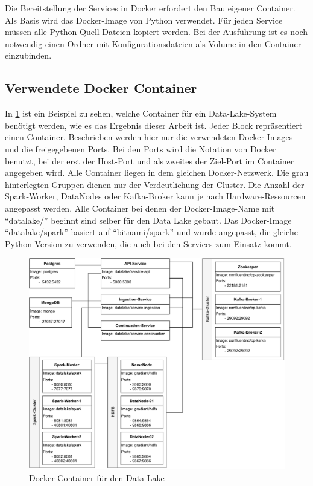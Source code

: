 Die Bereitstellung der Services in Docker erfordert den Bau eigener Container.
Als Basis wird das Docker-Image von Python verwendet.
Für jeden Service müssen alle Python-Quell-Dateien kopiert werden.
Bei der Ausführung ist es noch notwendig einen Ordner mit Konfigurationsdateien als Volume in den Container einzubinden.

\subsection{Verwendete Docker Container}

In \cref{fig:docker-datalake} ist ein Beispiel zu sehen, welche Container für ein Data-Lake-System benötigt werden, wie es das Ergebnis dieser Arbeit ist.
Jeder Block repräsentiert einen Container.
Beschrieben werden hier nur die verwendeten Docker-Images und die freigegebenen Ports.
Bei den Ports wird die Notation von Docker benutzt, bei der erst der Host-Port und als zweites der Ziel-Port im Container angegeben wird.
Alle Container liegen in dem gleichen Docker-Netzwerk.
Die grau hinterlegten Gruppen dienen nur der Verdeutlichung der Cluster.
Die Anzahl der Spark-Worker, DataNodes oder Kafka-Broker kann je nach Hardware-Ressourcen angepasst werden.
Alle Container bei denen der Docker-Image-Name mit "`datalake/"' beginnt sind selber für den Data Lake gebaut.
Das Docker-Image "`datalake/spark"' basiert auf "`bitnami/spark"' und wurde angepasst, die gleiche Python-Version zu verwenden, die auch bei den Services zum Einsatz kommt.

\begin{figure}
    \centering
    \includegraphics[width=\textwidth]{Grafiken/Umsetzung-Docker-Lake.pdf}
    \caption{Docker-Container für den Data Lake}
    \label{fig:docker-datalake}
\end{figure}
